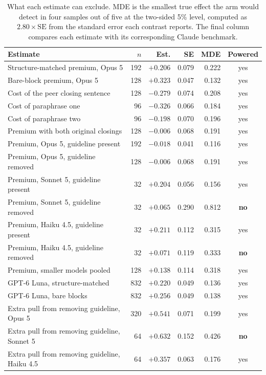 \begin{table}[t]
\centering
\caption{What each estimate can exclude. MDE is the smallest true effect the arm
would detect in four samples out of five at the two-sided 5\% level, computed as
$2.80\times\mathrm{SE}$ from the standard error each contrast reports. The final
column compares each estimate with its corresponding Claude benchmark.}
\label{tab:power}
\small
\begin{tabular}{lrrrrc}
\toprule
Estimate & $n$ & Est. & SE & MDE & Powered \\
\midrule
Structure-matched premium, Opus 5 & 192 & $+0.206$ & 0.079 & 0.222 & yes \\
Bare-block premium, Opus 5 & 128 & $+0.323$ & 0.047 & 0.132 & yes \\
Cost of the peer closing sentence & 128 & $-0.279$ & 0.074 & 0.208 & yes \\
Cost of paraphrase one & 96 & $-0.326$ & 0.066 & 0.184 & yes \\
Cost of paraphrase two & 96 & $-0.198$ & 0.070 & 0.196 & yes \\
Premium with both original closings & 128 & $-0.006$ & 0.068 & 0.191 & yes \\
Premium, Opus 5, guideline present & 192 & $-0.018$ & 0.041 & 0.116 & yes \\
Premium, Opus 5, guideline removed & 128 & $-0.006$ & 0.068 & 0.191 & yes \\
Premium, Sonnet 5, guideline present & 32 & $+0.204$ & 0.056 & 0.156 & yes \\
Premium, Sonnet 5, guideline removed & 32 & $+0.065$ & 0.290 & 0.812 & \textbf{no} \\
Premium, Haiku 4.5, guideline present & 32 & $+0.211$ & 0.112 & 0.315 & yes \\
Premium, Haiku 4.5, guideline removed & 32 & $+0.071$ & 0.119 & 0.333 & \textbf{no} \\
Premium, smaller models pooled & 128 & $+0.138$ & 0.114 & 0.318 & yes \\
GPT-6 Luna, structure-matched & 832 & $+0.220$ & 0.049 & 0.136 & yes \\
GPT-6 Luna, bare blocks & 832 & $+0.256$ & 0.049 & 0.138 & yes \\
Extra pull from removing guideline, Opus 5 & 320 & $+0.541$ & 0.071 & 0.199 & yes \\
Extra pull from removing guideline, Sonnet 5 & 64 & $+0.632$ & 0.152 & 0.426 & \textbf{no} \\
Extra pull from removing guideline, Haiku 4.5 & 64 & $+0.357$ & 0.063 & 0.176 & yes \\
\bottomrule
\end{tabular}
\end{table}
